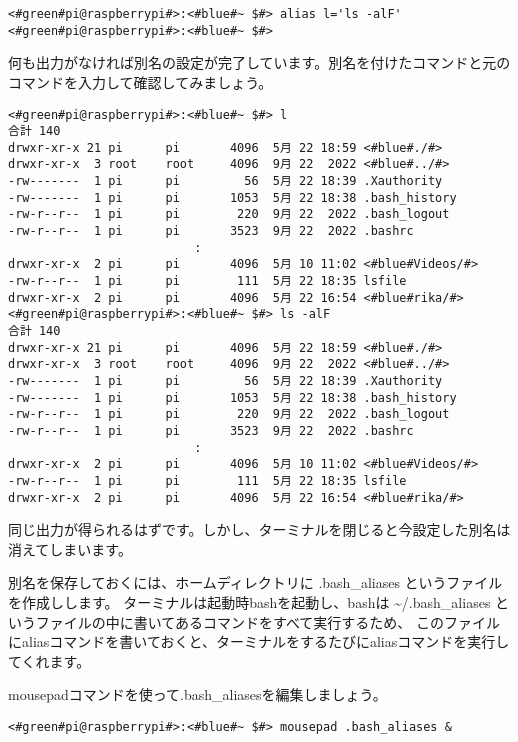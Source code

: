 \begin{lstlisting}[caption=aliasコマンドの例, label=aliasCommandExample]
<#green#pi@raspberrypi#>:<#blue#~ $#> alias l='ls -alF'
<#green#pi@raspberrypi#>:<#blue#~ $#>
\end{lstlisting}
何も出力がなければ別名の設定が完了しています。別名を付けたコマンドと元のコマンドを入力して確認してみましょう。
\begin{lstlisting}[caption=別名の確認, label=confirmAlias]
<#green#pi@raspberrypi#>:<#blue#~ $#> l
合計 140
drwxr-xr-x 21 pi      pi       4096  5月 22 18:59 <#blue#./#>
drwxr-xr-x  3 root    root     4096  9月 22  2022 <#blue#../#>
-rw-------  1 pi      pi         56  5月 22 18:39 .Xauthority
-rw-------  1 pi      pi       1053  5月 22 18:38 .bash_history
-rw-r--r--  1 pi      pi        220  9月 22  2022 .bash_logout
-rw-r--r--  1 pi      pi       3523  9月 22  2022 .bashrc
                          : 
drwxr-xr-x  2 pi      pi       4096  5月 10 11:02 <#blue#Videos/#>
-rw-r--r--  1 pi      pi        111  5月 22 18:35 lsfile
drwxr-xr-x  2 pi      pi       4096  5月 22 16:54 <#blue#rika/#>
<#green#pi@raspberrypi#>:<#blue#~ $#> ls -alF
合計 140
drwxr-xr-x 21 pi      pi       4096  5月 22 18:59 <#blue#./#>
drwxr-xr-x  3 root    root     4096  9月 22  2022 <#blue#../#>
-rw-------  1 pi      pi         56  5月 22 18:39 .Xauthority
-rw-------  1 pi      pi       1053  5月 22 18:38 .bash_history
-rw-r--r--  1 pi      pi        220  9月 22  2022 .bash_logout
-rw-r--r--  1 pi      pi       3523  9月 22  2022 .bashrc
                          :
drwxr-xr-x  2 pi      pi       4096  5月 10 11:02 <#blue#Videos/#>
-rw-r--r--  1 pi      pi        111  5月 22 18:35 lsfile
drwxr-xr-x  2 pi      pi       4096  5月 22 16:54 <#blue#rika/#>
\end{lstlisting}
同じ出力が得られるはずです。しかし、ターミナルを閉じると今設定した別名は消えてしまいます。

別名を保存しておくには、ホームディレクトリに .bash{\_}aliases というファイルを作成しします。
ターミナルは起動時bashを起動し、bashは \textasciitilde/.bash{\_}aliases というファイルの中に書いてあるコマンドをすべて実行するため、
このファイルにaliasコマンドを書いておくと、ターミナルをするたびにaliasコマンドを実行してくれます。

mousepadコマンドを使って.bash{\_}aliasesを編集しましょう。
\begin{lstlisting}[caption=\textasciitilde/.bash\_aliasesを開く, label=openingbashAliases]
<#green#pi@raspberrypi#>:<#blue#~ $#> mousepad .bash_aliases &
\end{lstlisting}

